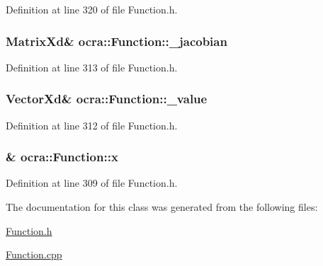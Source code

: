 Definition at line 320 of file Function.\+h.

\subsubsection[{\texorpdfstring{\+\_\+jacobian}{_jacobian}}]{\setlength{\rightskip}{0pt plus 5cm}Matrix\+Xd\& ocra\+::\+Function\+::\+\_\+jacobian\hspace{0.3cm}{\ttfamily [protected]}}\hypertarget{classocra_1_1Function_ade18c5f3f678fe0245dfc397e99112dc}{}\label{classocra_1_1Function_ade18c5f3f678fe0245dfc397e99112dc}


Definition at line 313 of file Function.\+h.

\subsubsection[{\texorpdfstring{\+\_\+value}{_value}}]{\setlength{\rightskip}{0pt plus 5cm}Vector\+Xd\& ocra\+::\+Function\+::\+\_\+value\hspace{0.3cm}{\ttfamily [protected]}}\hypertarget{classocra_1_1Function_adf9ae8a4ca631a787c99c4b499bea094}{}\label{classocra_1_1Function_adf9ae8a4ca631a787c99c4b499bea094}


Definition at line 312 of file Function.\+h.

\subsubsection[{\texorpdfstring{x}{x}}]{\& ocra\+::\+Function\+::x\hspace{0.3cm}{\ttfamily [protected]}}\hypertarget{classocra_1_1Function_a28825886d1f149c87b112ec2ec1dd486}{}\label{classocra_1_1Function_a28825886d1f149c87b112ec2ec1dd486}


Definition at line 309 of file Function.\+h.



The documentation for this class was generated from the following files\+:\begin{DoxyCompactItemize}
\item 
\hyperlink{Function_8h}{Function.\+h}\item 
\hyperlink{Function_8cpp}{Function.\+cpp}\end{DoxyCompactItemize}
